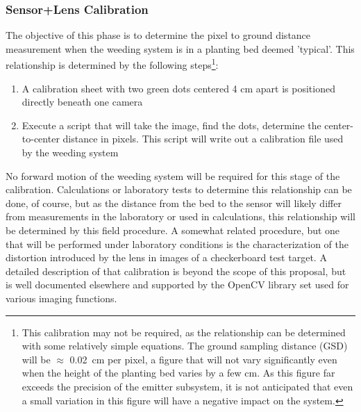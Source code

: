 \documentclass[12pt]{article}
\begin{document}
{\subsubsection{Sensor+Lens Calibration}
The objective of this phase is to determine the pixel to ground distance measurement when the weeding system is in a planting bed deemed 'typical'. This relationship is determined by the following steps\footnote{This calibration may not be required, as the relationship can be determined with some relatively simple equations. The ground sampling distance (GSD) will be $\approx$ \SI{0.02} {\centi\meter} per pixel, a figure that will not vary significantly even when the height of the planting bed varies by a few cm. As this figure far exceeds the precision of the emitter subsystem, it is not anticipated that even a small variation in this figure will have a negative impact on the system.}:
\begin{enumerate}
	\item{A calibration sheet with two green dots centered 4 cm apart is positioned directly beneath one camera}
	\item{Execute a script that will take the image, find the dots, determine the center-to-center distance in pixels. This script will write out a calibration file used by the weeding system}
\end{enumerate}
No forward motion of the weeding system will be required for this stage of the calibration. Calculations or laboratory tests to determine this relationship can be done, of course, but as the distance from the bed to the sensor will likely differ from measurements in the laboratory or used in calculations, this relationship will be determined by this field procedure.  A somewhat related procedure, but one that will be performed under laboratory conditions is the characterization of the distortion introduced by the lens in images of a checkerboard test target. A detailed description of that calibration is beyond the scope of this proposal, but is well documented elsewhere and supported by the OpenCV library set used for various imaging functions.
}
\end{document}

